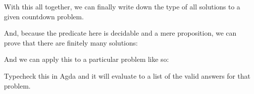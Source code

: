 With this all together, we can finally write down the type of all solutions to a
given countdown problem.
\begin{agdalisting*}
\end{agdalisting*}
And, because the predicate here is decidable and a mere proposition, we can
prove that there are finitely many solutions:
\begin{agdalisting*}
\end{agdalisting*}
And we can apply this to a particular problem like so:
\begin{agdalisting*}
\end{agdalisting*}
Typecheck this in Agda and it will evaluate to a list of the valid answers for
that problem.

